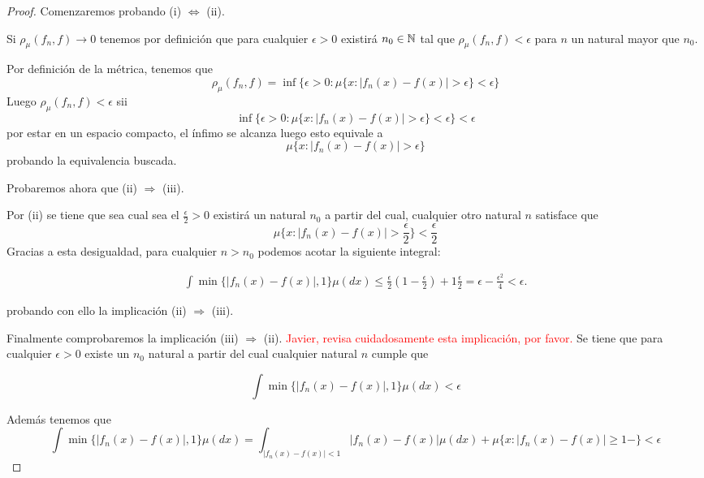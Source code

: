 \begin{proof}
    Comenzaremos probando (i) $\Longleftrightarrow$ (ii). 

    Si $\rho_{\mu}(f_n, f) \longrightarrow 0$
    tenemos por definición que 
    para cualquier $\epsilon > 0$ existirá $n_0 \in \mathbb{N}$ tal que 
    $\rho_{\mu}(f_n, f) < \epsilon$ para $n$ un natural mayor que $n_0$. 
    
    Por definición de la métrica, tenemos que 
    $$\rho_{\mu}(f_n, f) = \inf \{ \epsilon > 0: \mu \{ x : |f_n(x) - f(x)| > \epsilon \} < \epsilon \}$$
    Luego $\rho_{\mu}(f_n, f)  < \epsilon$ sii 
    $$\inf \{ \epsilon > 0: \mu \{ x : |f_n(x) - f(x)| > \epsilon \} < \epsilon \} < \epsilon$$
    por estar en un espacio compacto, el ínfimo se alcanza luego esto equivale a 
    $$\mu \{ x : |f_n(x) - f(x)| > \epsilon \}$$
    probando la equivalencia buscada.  

    Probaremos ahora que (ii) $\Longrightarrow$ (iii).   

    Por (ii) se tiene que sea cual sea el $\frac{\epsilon}{2} > 0$ 
    existirá un natural $n_0$ a partir del cual, cualquier otro natural $n$ 
    satisface que 
    $$\mu \{  x : |f_n(x) - f(x)| > \frac{\epsilon}{2}  \}  < \frac{\epsilon}{2}$$ 
    Gracias a esta desigualdad, para cualquier $n > n_0$ podemos acotar la siguiente integral: 

    \begin{equation}
        \begin{split}
            \int \min \{ |f_n(x) - f(x)|, 1\} \mu(dx) \leq
            \frac{\epsilon}{2} (1-\frac{\epsilon}{2}) + 1\frac{\epsilon}{2} 
             = \epsilon - \frac{\epsilon^2}{4} <  \epsilon.  
        \end{split}
    \end{equation}

    probando con ello la implicación (ii) $\Longrightarrow$ (iii).

    Finalmente comprobaremos la implicación (iii) $\Longrightarrow$ (ii).
    \textcolor{red}{ Javier, revisa cuidadosamente esta implicación, por favor. }
    Se tiene que para cualquier $\epsilon > 0$ existe un $n_0$ natural a partir del cual cualquier natural $n$
    cumple que 

    \begin{equation}
        \int \min \{ |f_n(x) - f(x)|, 1\} \mu(dx) < \epsilon
    \end{equation}

    Además tenemos que 
    \begin{equation}
        \int \min \{ |f_n(x) - f(x)|, 1\} \mu(dx) =  
        \int _ {|f_n(x) - f(x)|<1} |f_n(x) - f(x)| \mu(dx) + \mu \{ x : |f_n(x) - f(x)| \geq 1- \}  < \epsilon
    \end{equation}


\end{proof}
